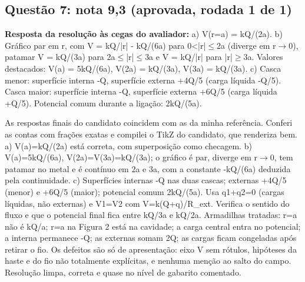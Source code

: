 \documentclass{article}%
\begin{document}
\subsection*{Questão 7: nota 9,3 (aprovada, rodada 1 de 1)}%
\textbf{Resposta da resolução às cegas do avaliador:} a) V(r=a) = kQ/(2a).\newline%
\newline%
b) Gráfico par em r, com V = kQ/|r| - kQ/(6a) para 0<|r|$\leq$2a (diverge em r$\to$0), patamar V = kQ/(3a) para 2a$\leq$|r|$\leq$3a e V = kQ/|r| para |r|$\geq$3a. Valores destacados: V(a) = 5kQ/(6a), V(2a) = kQ/(3a), V(3a) = kQ/(3a).\newline%
\newline%
c) Casca menor: superfície interna -Q, superfície externa +4Q/5 (carga líquida -Q/5). Casca maior: superfície interna -Q, superfície externa +6Q/5 (carga líquida +Q/5). Potencial comum durante a ligação: 2kQ/(5a).\par %
As respostas finais do candidato coincidem com as da minha referência. Conferi as contas com frações exatas e compilei o TikZ do candidato, que renderiza bem. a) V(a)=kQ/(2a) está correta, com superposição como checagem. b) V(a)=5kQ/(6a), V(2a)=V(3a)=kQ/(3a); o gráfico é par, diverge em r$\to$0, tem patamar no metal e é contínuo em 2a e 3a, com a constante -kQ/(6a) deduzida pela continuidade. c) Superfícies internas -Q nas duas cascas; externas +4Q/5 (menor) e +6Q/5 (maior); potencial comum 2kQ/(5a). Usa q1+q2=0 (cargas líquidas, não externas) e V1=V2 com V=k(Q+q)/R\_ext. Verifica o sentido do fluxo e que o potencial final fica entre kQ/3a e kQ/2a. Armadilhas tratadas: r=a não é kQ/a; r=a na Figura 2 está na cavidade; a carga central entra no potencial; a interna permanece -Q; as externas somam 2Q; as cargas ficam congeladas após retirar o fio. Os defeitos são só de apresentação: eixo V sem rótulos, hipóteses da haste e do fio não totalmente explícitas, e nenhuma menção ao salto do campo. Resolução limpa, correta e quase no nível de gabarito comentado.%
\end{document}
